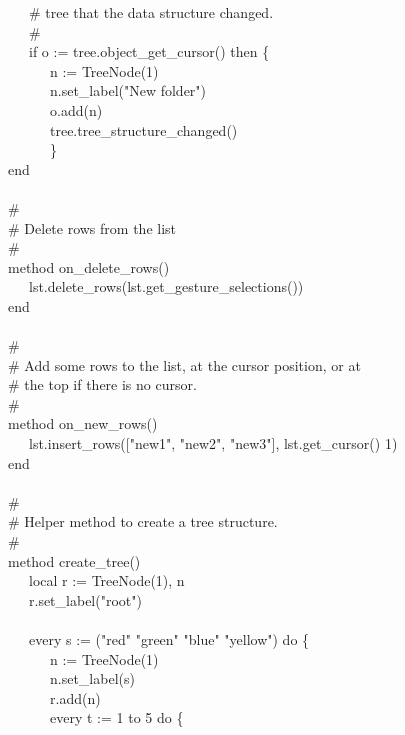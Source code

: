 {\>   \ \ \ \# tree that the data structure changed. \\
\>   \ \ \ \# \\
\>   \ \ \ if o := tree.object\_get\_cursor() then \{ \\
\>   \ \ \ \ \ \ n := TreeNode(1) \\
\>   \ \ \ \ \ \ n.set\_label("New
folder") \\
\>   \ \ \ \ \ \ o.add(n) \\
\>   \ \ \ \ \ \ tree.tree\_structure\_changed() \\
\>   \ \ \ \ \ \ \} \\
\>   end \\
\ \\
\>   \# \\
\>   \# Delete rows from the list \\
\>   \# \\
\>   method on\_delete\_rows() \\
\>   \ \ \ lst.delete\_rows(lst.get\_gesture\_selections()) \\
\>   end \\
\ \\
\>   \# \\
\>   \# Add some rows to the list, at the cursor position, or at \\
\>   \# the top if there is no cursor. \\
\>   \# \\
\>   method on\_new\_rows() \\
\>   \ \ \ lst.insert\_rows(["new1",
"new2",
"new3"], lst.get\_cursor() {\textbar} 1) \\
\>   end \\
\ \\
\>   \# \\
\>   \# Helper method to create a tree structure. \\
\>   \# \\
\>   method create\_tree() \\
\>   \ \ \ local r := TreeNode(1), n \\
\>   \ \ \ r.set\_label("root") \\
\ \\
\>   \ \ \ every s := ("red" {\textbar}
"green" {\textbar}
"blue" {\textbar}
"yellow") do \{ \\
\>   \ \ \ \ \ \ n := TreeNode(1) \\
\>   \ \ \ \ \ \ n.set\_label(s) \\
\>   \ \ \ \ \ \ r.add(n) \\
\>   \ \ \ \ \ \ every t := 1 to 5 do \{ \\
}
